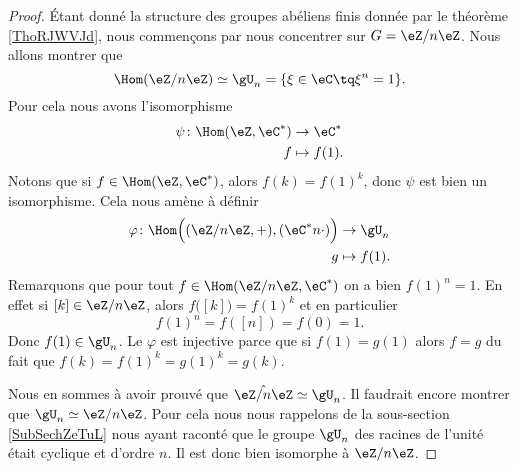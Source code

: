 \begin{proof}
    Étant donné la structure des groupes abéliens finis donnée par le théorème \ref{ThoRJWVJd}, nous commençons par nous concentrer sur \( G=\eZ/n\eZ\). Nous allons montrer que
    \begin{equation}
        \Hom(\eZ/n\eZ)\simeq \gU_n=\{ \xi\in \eC\tq \xi^n=1 \}.
    \end{equation}
    Pour cela nous avons l'isomorphisme
    \begin{equation}
        \begin{aligned}
            \psi\colon \Hom(\eZ,\eC^*)&\to \eC^* \\
            f&\mapsto f(1). 
        \end{aligned}
    \end{equation}
    Notons que si \( f\in \Hom(\eZ,\eC^*)\), alors \( f(k)=f(1)^k\), donc \( \psi\) est bien un isomorphisme. Cela nous amène à définir
    \begin{equation}
        \begin{aligned}
            \varphi\colon \Hom\Big( (\eZ/n\eZ,+),(\eC^*n\cdot) \Big)&\to \gU_n \\
            g&\mapsto f(1). 
        \end{aligned}
    \end{equation}
    Remarquons que pour tout \( f\in\Hom(\eZ/n\eZ,\eC^*)\) on a bien \( f(1)^n=1\). En effet si \( [k]\in \eZ/n\eZ\), alors \( f\big( [k] \big)=f(1)^k\) et en particulier
    \begin{equation}
        f(1)^n=f([n])=f(0)=1.
    \end{equation}
    Donc \( f(1)\in \gU_n\). Le \( \varphi\) est injective parce que si \( f(1)=g(1)\) alors \( f=g\) du fait que \( f(k)=f(1)^k=g(1)^k=g(k)\).

    Nous en sommes à avoir prouvé que \( \hat{\eZ/n\eZ}\simeq \gU_n\). Il faudrait encore montrer que \( \gU_n\simeq \eZ/n\eZ\). Pour cela nous nous rappelons de la sous-section \ref{SubSechZeTuL} nous ayant raconté que le groupe \( \gU_n\) des racines de l'unité était cyclique et d'ordre \( n\). Il est donc bien isomorphe à \( \eZ/n\eZ\).


\end{proof}
